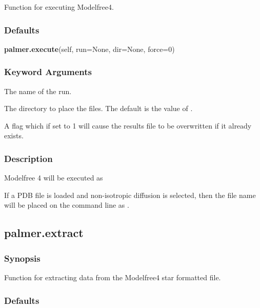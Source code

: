 Function for executing Modelfree4.



\subsubsection{Defaults}

\textsf{\textbf{palmer.execute}(self, run=None, dir=None, force=0)}


\subsubsection{Keyword Arguments}

  The name of the run. 

  The directory to place the files.  The default is the value of . 

  A flag which if set to 1 will cause the results file to be overwritten if it already exists. 




\subsubsection{Description}

Modelfree 4 will be executed as



If a PDB file is loaded and non-isotropic diffusion is selected, then the file name will be placed on the command line as .




\newpage

\subsection{palmer.extract}


\subsubsection{Synopsis}

Function for extracting data from the Modelfree4  star formatted file.



\subsubsection{Defaults}

